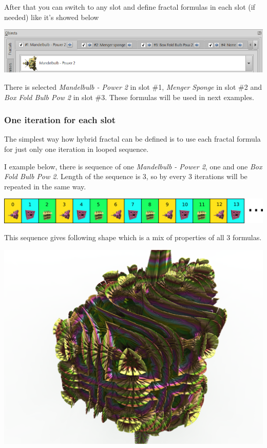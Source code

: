 After that you can switch to any slot and define fractal formulas in each slot
(if needed) like it's showed below

\includegraphics[width=\linewidth]{img/manual/media/fractal_tabs_with_defined_fractals.png}

There is selected \emph{Mandelbulb - Power 2} in slot \#1, \emph{Menger Sponge}
in slot \#2 and \emph{Box Fold Bulb Pow 2} in slot \#3. These formulas will be
used in next examples.

\subsubsection{One iteration for each slot}

The simplest way how hybrid fractal can be defined is to use each fractal
formula for just only one iteration in looped sequence.

I example below, there is sequence of one \emph{Mandelbulb - Power 2}, one  and
one \emph{Box Fold Bulb Pow 2}. Length of the sequence is 3, so by every 3
iterations will be repeated in the same way.

\includegraphics[width=\linewidth]{img/manual/media/iteration_loop_hybrid_sequence_1.png}

This sequence gives following shape which is a mix of properties of all 3
formulas. \nopagebreak

\includegraphics[width=0.7\linewidth]{img/manual/media/hybrid_sequence_example_1.png}

